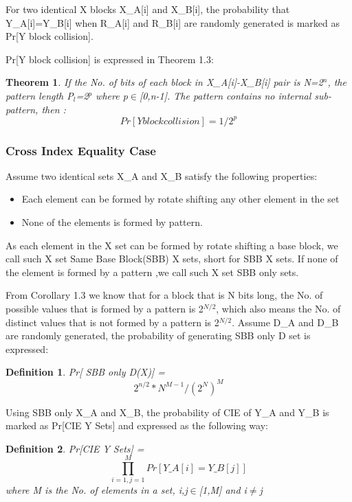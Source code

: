 \documentclass{article}
\newtheorem{theorem}{Theorem}[section]
\newtheorem{defination}{Definition}[section]
\begin{document}
For two identical X blocks X\_A[i] and X\_B[i], the probability that Y\_A[i]=Y\_B[i] when R\_A[i] and R\_B[i] are randomly generated is marked as  Pr[Y block collision]. 
 
 Pr[Y block collision] is expressed in Theorem 1.3:
\begin{theorem}
If the No. of bits of each block in X\_A[i]-X\_B[i] pair is N=2$^n$, the pattern length P$_l$=2$^p$ where p$\in$[0,n-1]. The pattern contains no internal sub-pattern, then :
\begin{displaymath}
Pr[Y block collision] = 1/2^p
\end{displaymath}
\end{theorem}

\subsubsection{Cross Index Equality Case}

Assume two identical sets X\_A and X\_B satisfy the following properties:
\begin{itemize}
	\item Each element can be formed by rotate shifting any other element in the set
	\item None of the elements is formed by pattern.
\end{itemize}
As each element in the X set can be formed by rotate shifting a base block, we call such X set Same Base Block(SBB) X sets, short for SBB X sets. If none of the element is formed by a pattern ,we call such X set SBB only sets.

From Corollary 1.3 we know that for a block that is N bits long, the No. of possible values that is formed by a pattern is 2$^{N/2}$, which also means the No. of distinct values that is not formed by a pattern is 2$^{N/2}$. Assume D\_A and D\_B are randomly generated, the probability of generating SBB only D set is expressed:
\begin{defination}
Pr[ SBB only D(X)] =
\begin{displaymath}
2^{n/2} * N^{M-1} / (2^N)^M
\end{displaymath}
\end{defination} 

Using SBB only X\_A and X\_B, the probability of CIE of Y\_A and Y\_B is marked as Pr[CIE Y Sets] and expressed as the following way:
\begin{defination}
Pr[CIE Y Sets] = $$\prod_{i=1,j=1}^M Pr[Y\_A[i] = Y\_B[j]]$$ where M is the No. of elements in a set, i,j$\in$[1,M] and i$\neq$j
\end{defination} 
\end{document}
